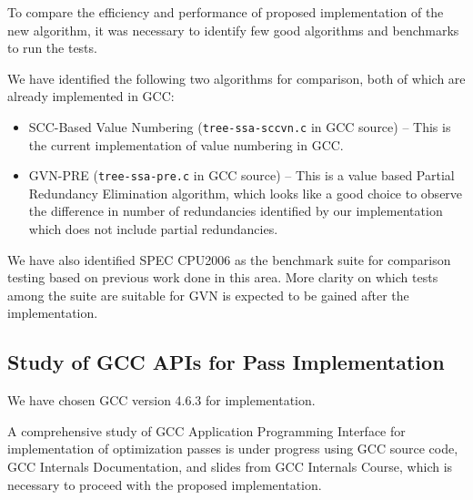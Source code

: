 To compare the efficiency and performance of proposed implementation of the new algorithm, it was necessary to identify few good algorithms and benchmarks to run the tests.

We have identified the following two algorithms for comparison, both of which are already implemented in GCC:
\begin{itemize}
	\item SCC-Based Value Numbering\cite{scc-vn} (\texttt{tree-ssa-sccvn.c} in GCC source) -- This is the current implementation of value numbering in GCC.
	\item GVN-PRE\cite{vandrunen,gvn-pre} (\texttt{tree-ssa-pre.c} in GCC source) -- This is a value based Partial Redundancy Elimination algorithm, which looks like a good choice to observe the difference in number of redundancies identified by our implementation which does not include partial redundancies.
\end{itemize}

We have also identified SPEC CPU2006\cite{spec-cpu06} as the benchmark suite for comparison testing based on previous work done in this area. More clarity on which tests among the suite are suitable for GVN is expected to be gained after the implementation.

\subsection{Study of GCC APIs for Pass Implementation}

We have chosen GCC version 4.6.3 for implementation.

A comprehensive study of GCC Application Programming Interface for implementation of optimization passes is under progress using GCC source code, GCC Internals Documentation\cite{gccint}, and slides from GCC Internals Course\cite{internals-course}, which is necessary to proceed with the proposed implementation.
